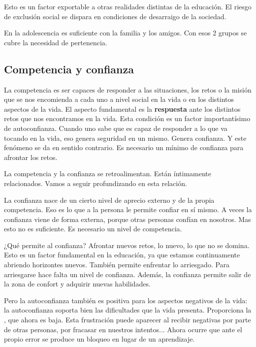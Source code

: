 \documentclass[palatino]{apuntesURJC}
\begin{document}
Esto es un factor exportable a otras realidades distintas de la educación. 
%
El riesgo de exclusión social se dispara en condiciones de desarraigo de la sociedad.

En la adolescencia es suficiente con la familia y los amigos. 
%
Con esos 2 grupos se cubre la necesidad de pertenencia.

	\subsection{Competencia y confianza} La competencia es ser capaces de responder a las situaciones, los retos o la misión que se nos encomienda a cada uno a nivel social en la vida o en los distintos aspectos de la vida. 
	El aspecto fundamental es la \textbf{respuesta} ante los distintos retos que nos encontramos en la vida.
	Esta condición es un factor importantísimo de autoconfianza. 
	Cuando uno sabe que es capaz de responder a lo que va tocando en la vida, eso genera seguridad en un mismo. Genera confianza.
	Y este fenómeno se da en sentido contrario.
	Es necesario un mínimo de confianza para afrontar los retos.


	La competencia y la confianza se retroalimentan. Están íntimamente relacionados.
	Vamos a seguir profundizando en esta relación.

	La confianza nace de un cierto nivel de aprecio externo y de la propia competencia. 
	Eso es lo que a la persona le permite confiar en sí mismo.
	A veces la confianza viene de forma externa, porque otras personas confían en nosotros. 
	Mas esto no es suficiente.
	Es necesario un nivel de competencia.

	¿Qué permite al confianza? Afrontar nuevos retos, lo nuevo, lo que no se domina. Esto es un factor fundamental en la educación, ya que estamos continuamente abriendo horizontes nuevos.
	También permite enfrentar lo arriesgado. Para arriesgarse hace falta un nivel de confianza.
	Además, la confianza permite salir de la zona de confort y adquirir nuevas habilidades.

	Pero la autoconfianza también es positiva para los aspectos negativos de la vida: la autoconfianza soporta bien las dificultades que la vida presenta.
	Proporciona la , que ahora es baja.
	Esta frustración puede aparecer al recibir negativas por parte de otras personas, por fracasar en nuestros intentos... Ahora ocurre que ante el propio error se produce un bloqueo en lugar de un aprendizaje.
\end{document}
